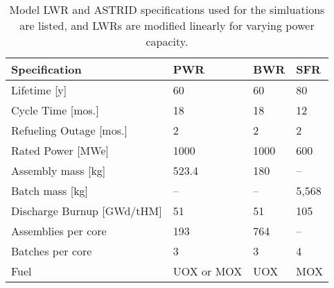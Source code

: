 \begin{table}[h]
	\centering
	\begin{tabularx}{\textwidth}{blll}
		\hline
		\textbf{Specification} & \textbf{\gls{PWR} \cite{sutharshan_ap1000tm_2011}} & \textbf{\gls{BWR} \cite{hinds_next-generation_2006}} & \textbf{\gls{SFR}} \cite{varaine_pre-conceptual_2012}\\
		\hline
                Lifetime [y] & 60 & 60 & 80 \\
                Cycle Time [mos.]& 18 & 18 & 12\\ 
                Refueling Outage [mos.]& 2 & 2  & 2\\
                Rated Power [MWe] & 1000 & 1000 & 600\\
                Assembly mass [kg] & 523.4 & 180 & -- \\
                Batch mass [kg] & -- & -- & 5,568\\
                Discharge Burnup [GWd/tHM] & 51 & 51 & 105 \\
                Assemblies per core & 193  & 764 & -- \\
                Batches per core & 3 & 3 & 4\\
                Fuel & \gls{UOX} or \gls{MOX} & \gls{UOX} & \gls{MOX} \\
		\hline
	\end{tabularx}
        \caption {Model \gls{LWR} and \gls{ASTRID} specifications used for the simluations are listed, and \glspl{LWR} are modified
        linearly for varying power capacity. }
	\label{tab:reactor-specs}
	\end{table}

	
\FloatBarrier

